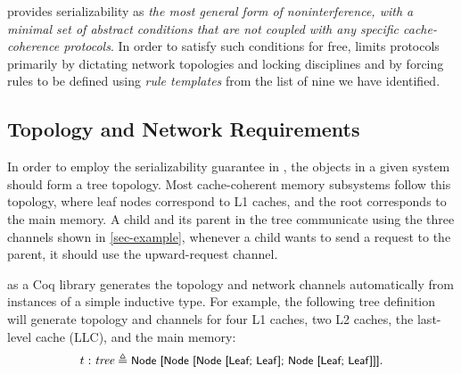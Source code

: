 \documentclass[sigplan,10pt,review,anonymous,screen]{acmart}\settopmatter{printfolios=true,printccs=false,printacmref=false}
\begin{document}


\hemiola{} provides serializability as \emph{the most general form of noninterference, with a minimal set of abstract conditions that are not coupled with any specific cache-coherence protocols}.
In order to satisfy such conditions for free, \hemiola{} limits protocols primarily by dictating network topologies and locking disciplines and by forcing rules to be defined using \emph{rule templates} from the list of nine we have identified.

\subsection{Topology and Network Requirements}

In order to employ the serializability guarantee in \hemiola{}, the objects in a given system should form a tree topology.
Most cache-coherent memory subsystems follow this topology, where leaf nodes correspond to L1 caches, and the root corresponds to the main memory.
A child and its parent in the tree communicate using the three channels shown in \autoref{sec-example}, \eg{} whenever a child wants to send a request to the parent, it should use the upward-request channel.

\hemiola{} as a Coq library generates the topology and network channels automatically from instances of a simple inductive type.
For example, the following tree definition will generate topology and channels for four L1 caches, two L2 caches, the last-level cache (LLC), and the main memory:
\begin{displaymath}
  t : \textit{tree} \triangleq \small{\textsf{Node [Node [Node [Leaf; Leaf]; Node [Leaf; Leaf]]]}}.
\end{displaymath}
\end{document}
